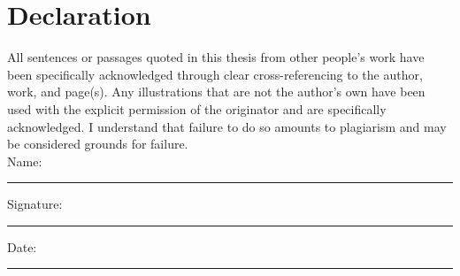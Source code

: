 \documentclass[12pt,oneside]{book}
\begin{document}

\newpage
\section*{\Large Declaration}

All sentences or passages quoted in this thesis from other people's work have been specifically acknowledged through clear cross-referencing to the author, work, and page(s). Any illustrations that are not the author's own have been used with the explicit permission of the originator and are specifically acknowledged. I understand that failure to do so amounts to plagiarism and may be considered grounds for failure.\\[1cm]

\noindent Name:\\[1mm]
\rule[1em]{25em}{0.5pt}

\noindent Signature:\\[1mm]
\rule[1em]{25em}{0.5pt}

\noindent Date:\\[1mm]
\rule[1em]{25em}{0.5pt}

% 

% 


\end{document}

